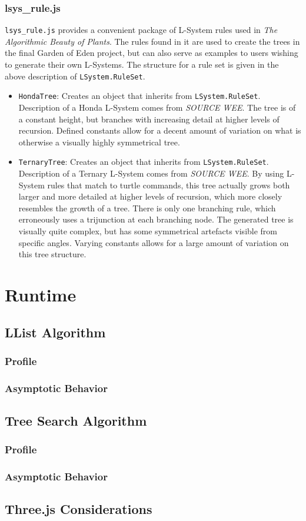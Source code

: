 \documentclass{article}
\newcommand{\tab}{\hspace*{2em}}
\begin{document}
            \subsubsection{lsys\_rule.js}
    \tab \verb|lsys_rule.js| provides a convenient package of L-System rules used in \emph{The
Algorithmic Beauty of Plants}. The rules found in it are used to create the trees in the final
Garden of Eden project, but can also serve as examples to users wishing to generate their own
L-Systems. The structure for a rule set is given in the above description of
\verb|LSystem.RuleSet|.
    \begin{itemize}
        \item \verb|HondaTree|: Creates an object that inherits from \verb|LSystem.RuleSet|.
Description of a Honda L-System comes from \emph{SOURCE WEE}. The tree is of a constant height, but
branches with increasing detail at higher levels of recursion. Defined constants allow for a
decent amount of variation on what is otherwise a visually highly symmetrical tree.

        \item \verb|TernaryTree|: Creates an object that inherits from \verb|LSystem.RuleSet|.
Description of a Ternary L-System comes from \emph{SOURCE WEE}. By using L-System rules that match
to turtle commands, this tree actually grows both larger and more detailed at higher levels of
recursion, which more closely resembles the growth of a tree. There is only one branching rule,
which erroneously uses a trijunction at each branching node. The generated tree is visually quite
complex, but has some symmetrical artefacts visible from specific angles. Varying constants allows
for a large amount of variation on this tree structure.

    \end{itemize}

    \section{Runtime} %
        \subsection{LList Algorithm}
            \subsubsection{Profile}
            \subsubsection{Asymptotic Behavior}
        \subsection{Tree Search Algorithm}
            \subsubsection{Profile}
            \subsubsection{Asymptotic Behavior}
        \subsection{Three.js Considerations}
\end{document}
